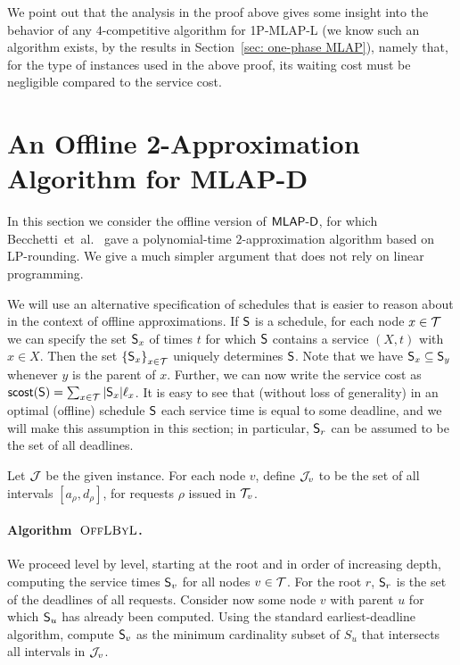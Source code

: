 \documentclass[a4paper]{article}
\newcommand{\etal}{et~al.}
\newcommand{\calJ}{{\cal J}}
\newcommand{\calT}{{\cal T}}
\newcommand{\braced}[1]{{ \left\{ #1 \right\} }}
\newcommand{\scost}{\mbox{\rm\textsf{scost}}}
\newcommand{\length}{\ell}
\newcommand{\algLBL}{\mbox{\sc OffLByL}}
\newcommand{\MLAPD}{\mbox{\rm\textsf{MLAP-D}}}
\newcommand{\SPMLAPL}{\mbox{\rm\textsf{1P-MLAP-L}}}
\newcommand{\schedS}{\mbox{\rm\textsf{S}}}
\begin{document}
We point out that
the analysis in the proof above gives some insight into the behavior of any
$4$-competitive algorithm for {\SPMLAPL} (we know such an algorithm
exists, by the results in Section~\ref{sec: one-phase MLAP}), namely that,
for the type of instances used in the above proof,
its waiting cost must be negligible compared to the service cost.


\section{An Offline 2-Approximation Algorithm for {\MLAPD}}
\label{sec: mlap with deadlines}

In this section we consider the offline version of $\MLAPD$, for which Becchetti~\etal~\cite{packet-aggregation-becchetti}
gave a polynomial-time $2$-approximation algorithm based on LP-rounding. We give a
much simpler argument that does not rely on linear programming. 

We will use an alternative specification of schedules that
is easier to reason about in the context of offline approximations.
If $\schedS$ is a schedule, for each node
$x\in \calT$ we can specify the set $\schedS_x$ of times $t$ for which
$\schedS$ contains a service $(X,t)$ with $x\in X$. Then the set
$\braced{\schedS_x}_{x\in \calT}$ uniquely determines $\schedS$.  Note
that we have $\schedS_x\subseteq \schedS_y$ whenever $y$ is the parent
of $x$.  Further, we can now write the service cost as
$\scost(\schedS) = \sum_{x\in\calT} |\schedS_x|\length_x$.  It is easy to
see that (without loss of generality) in an optimal (offline) schedule
$\schedS$ each service time is equal to some deadline, and we will
make this assumption in this section; in particular,
$\schedS_{r}$ can be assumed to be the set of all deadlines.

Let $\calJ$ be the given instance. For each node $v$, define $\calJ_v$ to be the set of all intervals $[a_\rho,d_\rho]$, 
for requests $\rho$ issued in $\calT_v$. 


\paragraph{Algorithm~$\algLBL$.}

We proceed level by level, starting at the root and in order of increasing depth, computing the service 
times $\schedS_v$ for all nodes $v \in \calT$. 
For the root $r$, $\schedS_r$ is the set of the deadlines of all requests.
Consider now some node $v$ with parent $u$ for which $\schedS_u$ has already been computed. 
Using the standard earliest-deadline algorithm, compute $\schedS_v$ as the minimum cardinality subset of $S_u$
that intersects all intervals in $\calJ_v$.
\end{document}
